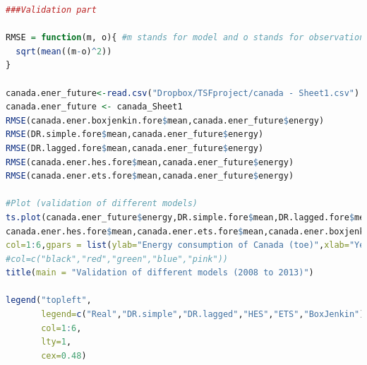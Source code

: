 \documentclass[journal, a4paper]{IEEEtran}
\begin{document}
\begin{appendix}
\begin{lstlisting}[language=R,basicstyle=\tiny]
###Validation part

RMSE = function(m, o){ #m stands for model and o stands for observation
  sqrt(mean((m-o)^2))
}

canada.ener_future<-read.csv("Dropbox/TSFproject/canada - Sheet1.csv")
canada.ener_future <- canada_Sheet1
RMSE(canada.ener.boxjenkin.fore$mean,canada.ener_future$energy)
RMSE(DR.simple.fore$mean,canada.ener_future$energy)
RMSE(DR.lagged.fore$mean,canada.ener_future$energy)
RMSE(canada.ener.hes.fore$mean,canada.ener_future$energy)
RMSE(canada.ener.ets.fore$mean,canada.ener_future$energy)

#Plot (validation of different models)
ts.plot(canada.ener_future$energy,DR.simple.fore$mean,DR.lagged.fore$mean,
canada.ener.hes.fore$mean,canada.ener.ets.fore$mean,canada.ener.boxjenkin.fore$mean,
col=1:6,gpars = list(ylab="Energy consumption of Canada (toe)",xlab="Year"))
#col=c("black","red","green","blue","pink"))
title(main = "Validation of different models (2008 to 2013)")

legend("topleft",           
       legend=c("Real","DR.simple","DR.lagged","HES","ETS","BoxJenkin"), 
       col=1:6,
       lty=1,              
       cex=0.48)

\end{lstlisting}  
\end{appendix}
\end{document}
